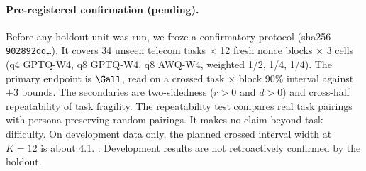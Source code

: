 \paragraph{Pre-registered confirmation (pending).} Before any holdout unit was run, we froze a confirmatory protocol (sha256 \texttt{902892dd\ldots}). It covers 34 unseen telecom tasks $\times$ 12 fresh nonce blocks $\times$ 3 cells (q4 GPTQ-W4, q8 GPTQ-W4, q8 AWQ-W4, weighted 1/2, 1/4, 1/4). %
The primary endpoint is $\Gall$, read on a crossed task $\times$ block 90\% interval against $\pm$3\pp{} bounds. The secondaries are two-sidedness ($r>0$ and $d>0$) and cross-half repeatability of task fragility. The repeatability test compares real task pairings with persona-preserving random pairings. It makes no claim beyond task difficulty. On development data only, the planned crossed interval width at $K=12$ is about 4.1\pp{}. %
. Development results are not retroactively confirmed by the holdout. 

